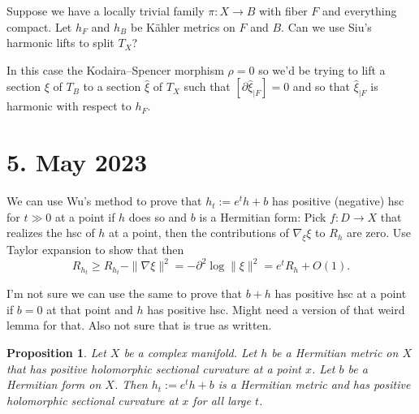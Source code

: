 \documentclass[11pt]{article}
\newtheorem{prop}[theo]{Proposition}
\theoremstyle{definition}
\begin{document}
Suppose we have a locally trivial family $\pi : X \to B$ with fiber $F$ and
everything compact.
Let $h_F$ and $h_B$ be K\"ahler metrics on $F$ and $B$.
Can we use Siu's harmonic lifts to split $T_X$?

In this case the Kodaira--Spencer morphism $\rho = 0$
so we'd be trying to lift a section $\xi$ of $T_B$ to a section $\hat \xi$ of
$T_X$ such that $[\partial \hat\xi_{|F}] = 0$
and so that $\hat \xi_{|F}$ is harmonic with respect to $h_F$.

\section{5. May 2023}

We can use Wu's method to prove that $h_t := e^t h + b$ has positive (negative)
hsc for $t \gg 0$ at a point if $h$ does so and $b$ is a Hermitian form:
Pick $f : D \to X$ that realizes the hsc of $h$ at a point, then the
contributions of $\nabla_\xi \xi$ to $R_{h}$ are zero.
Use Taylor expansion to show that then
$$
R_{h_t}
\geq R_{h_t} - \| \nabla \xi \|^2
= - \partial^2 \log \|\xi\|^2
= e^t R_h + O(1).
$$

I'm not sure we can use the same to prove that $b + h$ has positive hsc at a
point if $b = 0$ at that point and $h$ has positive hsc.
Might need a version of that weird lemma for that.
Also not sure that is true as written.


\begin{prop}
Let $X$ be a complex manifold.
Let $h$ be a Hermitian metric on $X$ that has positive holomorphic sectional curvature at a point $x$.
Let $b$ be a Hermitian form on $X$.
Then $h_t := e^t h + b$ is a Hermitian metric and has positive holomorphic
sectional curvature at $x$ for all large $t$.
\end{prop}
\end{document}
